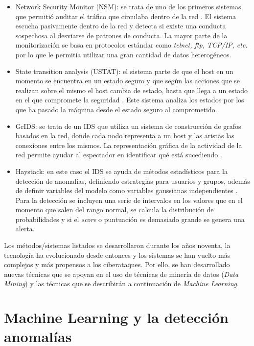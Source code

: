 \begin{itemize}
    \item Network Security Monitor (NSM):  se trata de uno de los primeros sistemas que permitió auditar el tráfico que circulaba dentro de la red \cite{surveyIDS}. El sistema escucha pasivamente dentro de la red y detecta si existe una conducta sospechosa al desviarse de patrones de conducta. La mayor parte de la monitorización se basa en protocolos estándar como \textit{telnet, ftp, TCP/IP, etc.} por lo que le permitía utilizar una gran cantidad de datos heterogéneos.
    \item State transition analysis (USTAT): el sistema parte de que el host en un momento se encuentra en un estado seguro y que según las acciones que se realizan sobre el mismo el host cambia de estado, hasta que llega a un estado en el que compromete la seguridad \cite{surveyIDS}. Este sistema analiza los estados por los que ha pasado la máquina desde el estado seguro al comprometido. 
    \item GrIDS: se trata de un IDS que utiliza un sistema de construcción de grafos basados en la red, donde cada nodo representa a un host y las aristas las conexiones entre los mismos. La representación gráfica de la actividad de la red permite ayudar al espectador en identificar qué está sucediendo \cite{surveyIDS}.
    \item Haystack: en este caso el IDS se ayuda de métodos estadísticos para la detección de anomalías, definiendo estrategias para usuarios y grupos, además de definir variables del modelo como variables gaussianas independientes \cite{garcia2009anomaly}. Para la detección se incluyen una serie de intervalos en los valores que en el momento que salen del rango normal, se calcula la distribución de probabilidades y si el \textit{score} o puntuación es demasiado grande se genera una alerta.
\end{itemize}

Los métodos/sistemas listados se desarrollaron durante los años noventa, la tecnología ha evolucionado desde entonces y los sistemas se han vuelto más complejos y más propensos a los ciberataques. Por ello, se han desarrollado nuevas técnicas que se apoyan en el uso de técnicas de minería de datos (\textit{Data Mining}) y las técnicas que se describirán a continuación de \textit{Machine Learning}.

\section{Machine Learning y la detección anomalías}

